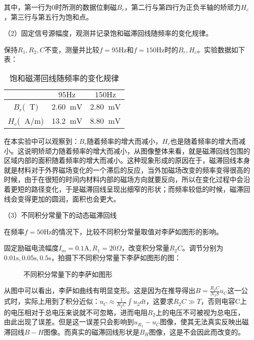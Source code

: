 \documentclass[11pt]{article}
\newcommand*{\unit}[1]{\mathop{}\!\mathrm{#1}}
\begin{document}
其中，第一行为0时所测的数据位剩磁$B_r$，第二行与第四行为正负半轴的矫顽力$H_c$，第三行与第五行为饱和点。

（2）固定信号源幅度，观测并记录饱和磁滞回线随频率的变化规律。

保持$R_1,R_2,C$不变，测量并比较$f=95\text{Hz}$和$f=150\text{Hz}$时的$B_r,H_c$。实验数据如下表：

\begin{table}[H]
    \centering
    \begin{tabular}{|c|c|c|}
        \hline
          & $95\text{Hz}$ & $150\text{Hz}$ \\ \hline
        $B_r$($\unit{T}$) & 2.60$\unit{mV}$ & 2.80$\unit{mV}$ \\ \hline
        $H_c$($\unit{A/m}$) & 13.2$\unit{mV}$ & 8.80$\unit{mV}$ \\ \hline
    \end{tabular}
    \caption{饱和磁滞回线随频率的变化规律}
\end{table}

在本实验中可以观察到：$B_r$随着频率的增大而减小，$H_c$也是随着频率的增大而减小。这说明矫顽力随着频率的增大而减小，从图像整体来看，就是磁滞回线包围的区域内部的面积随着频率的增大而减小。这种现象形成的原因在于，磁滞回线本身就是材料对于外界磁场变化的一个滞后的反应，当外加磁场改变的频率变得很高的时候，由于在很短的时间内材料内部的磁场方向就要反向，所以在变化过程中会沿着更短的路径变化，于是磁滞回线呈现出细窄的形状；而频率较低的时候，磁滞回线会变得更加的圆润，面积也会更大。

（3）不同积分常量下的动态磁滞回线

在频率$f=50\text{Hz}$的情况下，比较不同积分常量取值对李萨如图形的影响。

固定励磁电流幅度$I_m=0.1\text{A},R_1=20\Omega$，改变积分常量$R_2C$。调节分别为$0.01\text{s},0.05\text{s},0.5\text{s}$，拍摄下不同积分常量下李萨如图形的图：

\begin{figure}[H]
	\centering
	\hspace{0.02\textwidth}
	\hspace{0.02\textwidth}
	\caption{不同积分常量下的李萨如图形}
\end{figure}

从图中可以看出，李萨如曲线有明显变形。这是因为在推导得出$B=\frac{R_2C}{N_2S}u_C$这一公式时，实际上用到了积分近似：$u_C\approx \frac{1}{R_2C}\int u_2dt$，这要求$R_2C\gg T$，否则电容C上的电压相对于总电压来说就不可忽略，进而电阻$R_2$上的电压不可被视为总电压，由此出现了误差。但是这一误差只会影响到$u_{R_1}-u_C$图像，使其无法真实反映出磁滞回线$B-H$图像。而真实的磁滞回线形状是$B_H$图像，这是不会因此而改变的。
\end{document}
